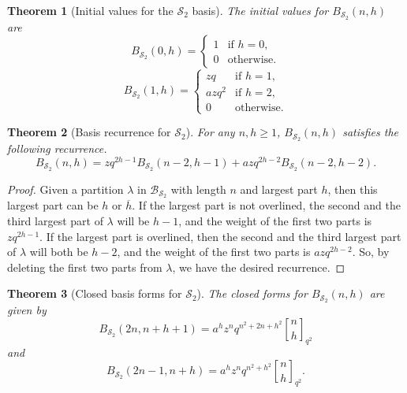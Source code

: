 \documentclass[11pt]{amsart}
\newtheorem{theorem}{Theorem}[section]
\theoremstyle{definition}
\theoremstyle{remark}
\numberwithin{equation}{section}
\begin{document}
\begin{theorem}[Initial values for the $\mathcal S_2$ basis]\label{thm:S2-initial}
The initial values for $B_{\mathcal S_2}(n,h)$ are
\begin{equation*}
    B_{\mathcal S_2}(0,h)=\begin{cases}
        1 &  \text{if $h=0$,}\\
        0 &  \text{otherwise.}
    \end{cases}
\end{equation*}
\begin{equation*}
    B_{\mathcal S_2}(1,h)=\begin{cases}
        zq &  \text{if $h=1$,}\\
        azq^2 & \text{if $h=2$,}\\
        0 &  \text{otherwise.}
            \end{cases}
\end{equation*}
\end{theorem}

\begin{theorem}[Basis recurrence for $\mathcal S_2$]\label{thm:S2-recurrence}
For any $n,h\geq1$, $B_{\mathcal S_2}(n,h)$ satisfies the following recurrence.
\begin{equation}\label{eq:S2Rec}
B_{\mathcal S_2}(n,h)=zq^{2h-1}B_{\mathcal S_2}(n-2,h-1)+azq^{2h-2}B_{\mathcal S_2}(n-2,h-2).
\end{equation}
\end{theorem}

\begin{proof}
Given a partition $\lambda$ in $\mathcal{B}_{\mathcal{S}_2}$ with length $n$ and largest part $h$, then this largest part can be $h$ or $\overline{h}$. If the largest part is not overlined, the second and the third largest part of $\lambda$ will be $h-1$, and the weight of the first two parts is $zq^{2h-1}$. If the largest part is overlined, then the second and the third largest part of $\lambda$ will both be $h-2$, and the weight of the first two parts is $azq^{2h-2}$. So, by deleting the first two parts from $\lambda$, we have the desired recurrence.
\end{proof}

\begin{theorem}[Closed basis forms for $\mathcal S_2$]\label{thm:S2-closed}
The closed forms for $B_{\mathcal S_2}(n,h)$ are given by
\begin{equation}\label{eq:S2B1}
B_{\mathcal S_2}(2n,n+h+1)=a^hz^nq^{n^2+2n+h^2}{n\brack h}_{q^2}
\end{equation}
and
\begin{equation}\label{eq:S2B2}
B_{\mathcal S_2}(2n-1,n+h)=a^hz^nq^{n^2+h^2}{n\brack h}_{q^2}.
\end{equation}
\end{theorem}
\end{document}

